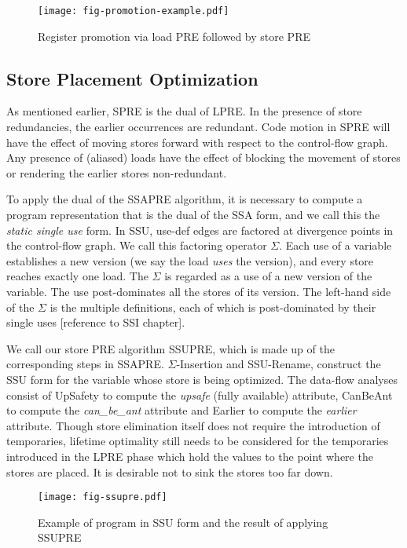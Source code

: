 \begin{figure}
\centering
\texttt{[image: fig-promotion-example.pdf]}
\caption{Register promotion via load PRE followed by store PRE}
\label{fig:promotion-example}
\end{figure}

\subsection{Store Placement Optimization}

As mentioned earlier, SPRE is the dual of LPRE. 
In the presence of store redundancies, the earlier occurrences are redundant. 
Code motion in SPRE will have the effect of moving stores forward with respect to the control-flow graph. 
Any presence of (aliased) loads have the effect of blocking the movement of stores or rendering the earlier stores non-redundant.

To apply the dual of the SSAPRE algorithm, it is necessary to compute a program representation that is the dual of the SSA form, and we call this the \emph{static single use} form. 
In SSU, use-def edges are factored at divergence points in the control-flow graph. 
We call this factoring operator $\Sigma$. 
Each use of a variable establishes a new version (we say the load \emph{uses} the version), and every store reaches exactly one load. 
The $\Sigma$ is regarded as a use of a new version of the variable. 
The use post-dominates all the stores of its version. 
The left-hand side of the $\Sigma$ is the multiple definitions, each of which is post-dominated by their single uses [reference to SSI chapter].

We call our store PRE algorithm SSUPRE, which is made up of the corresponding steps in SSAPRE. 
$\Sigma$-Insertion and SSU-Rename, construct the SSU form for the variable whose store is being optimized. 
The data-flow analyses consist of UpSafety to compute the \emph{upsafe} (fully available) attribute, CanBeAnt to compute the \emph{can\_be\_ant} attribute and Earlier to compute the \emph{earlier} attribute. 
Though store elimination itself does not require the introduction of temporaries, lifetime optimality still needs to be considered for the temporaries introduced in the LPRE phase which hold the values to the point where the stores are placed. 
It is desirable not to sink the stores too far down.

\begin{figure}
\centering
\texttt{[image: fig-ssupre.pdf]}
\caption{Example of program in SSU form and the result of applying SSUPRE}
\label{fig:ssupre}
\end{figure}


